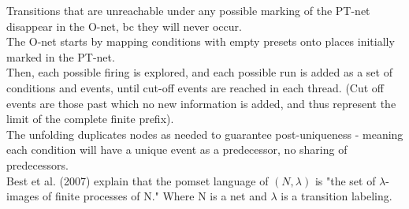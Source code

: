 Transitions that are unreachable under any possible marking of the PT-net disappear in the O-net, bc they will never occur.\\

The O-net starts by mapping conditions with empty presets onto places initially marked in the PT-net.\\

Then, each possible firing is explored, and each possible run is added as a set of conditions and events, until cut-off events are reached in each thread. (Cut off events are those past which no new information is added, and thus represent the limit of the complete finite prefix).\\

The unfolding duplicates nodes as needed to guarantee post-uniqueness - meaning each condition will have a unique event as a predecessor, no sharing of predecessors. \\


Best et al. (2007) explain that the pomset language of $(N, \lambda)$ is "the set of $\lambda$-images of finite processes of N." Where N is a net and $\lambda$ is a transition labeling.

  

